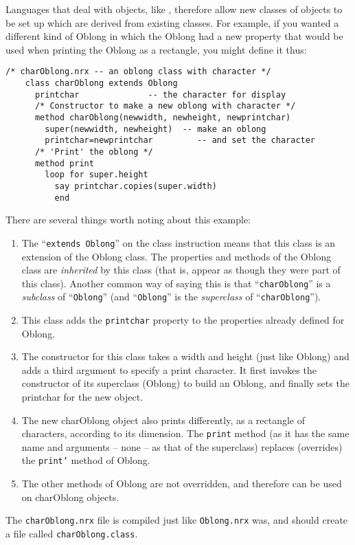 Languages that deal with objects, like \nr{}, therefore allow new
classes of objects to be set up which are derived from existing
classes. For example, if you wanted a different kind of Oblong in
which the Oblong had a new property that would be used when printing
the Oblong as a rectangle, you might define it thus:
\begin{lstlisting}[label=charoblong,caption=charOblong.nrx]
    /* charOblong.nrx -- an oblong class with character */
    class charOblong extends Oblong
      printchar              -- the character for display
      /* Constructor to make a new oblong with character */
      method charOblong(newwidth, newheight, newprintchar)
        super(newwidth, newheight)  -- make an oblong
        printchar=newprintchar         -- and set the character
      /* 'Print' the oblong */
      method print
        loop for super.height
          say printchar.copies(super.width)
          end
\end{lstlisting}
There are several things worth noting about this example:
\begin{enumerate}
\item The “\texttt{extends Oblong}” on the class instruction means that this class is an extension of the Oblong class. The properties and methods of the Oblong class are \emph{inherited} by this class (that is, appear as though they were part of this class).
Another common way of saying this is that “\texttt{charOblong}” is a \emph{subclass} of “\texttt{Oblong}” (and “\texttt{Oblong}” is the \emph{superclass} of “\texttt{charOblong}”).
\item This class adds the \texttt{printchar} property to the properties already defined for Oblong.
\item The constructor for this class takes a width and height (just like Oblong) and adds a third argument to specify a print character. It first invokes the constructor of its superclass (Oblong) to build an Oblong, and finally sets the printchar for the new object.
\item The new charOblong object also prints differently, as a rectangle of characters, according to its dimension. The \texttt{print} method (as it has the same name and arguments – none – as that of the superclass) replaces (overrides) the \texttt{print'} method of Oblong.
\item The other methods of Oblong are not overridden, and therefore
  can be used on charOblong objects.
\end{enumerate}
The \texttt{charOblong.nrx} file is compiled just like \texttt{Oblong.nrx} was, and
should create a file called \texttt{charOblong.class}.

